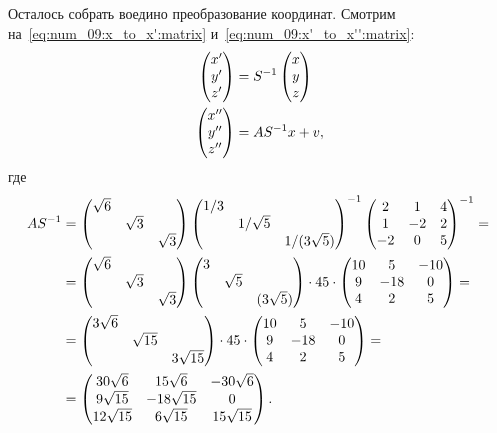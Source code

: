 \begin{solution}
	Осталось собрать воедино преобразование координат. Смотрим на~\eqref{eq:num_09:x_to_x':matrix} и~\eqref{eq:num_09:x'_to_x'':matrix}:
	\begin{align*}
		\begin{pmatrix}
			x' \\ y' \\ z'
		\end{pmatrix}
		&=
		S^{-1}
		\begin{pmatrix}
			x \\ y \\ z
		\end{pmatrix}
		\\
		\begin{pmatrix}
			x'' \\ y'' \\ z''
		\end{pmatrix}
		&=
		AS^{-1}x + v
		,
	\end{align*}
	где
	\begin{align*}
		AS^{-1} &=
		\begin{pmatrix}
			\sqrt{6} \\
			& \sqrt{3} \\
			&& \sqrt{3}
		\end{pmatrix}
		\begin{pmatrix}
			1/3 \\
			& 1/\sqrt{5} \\
			&& 1/(3\sqrt{5})
		\end{pmatrix}^{-1}
		\begin{pmatrix}
			2 & 1 & 4 \\
			1 & -2 & 2 \\
			-2 & 0 & 5
		\end{pmatrix}^{-1}
		= {} \\ {} &=
		\begin{pmatrix}
			\sqrt{6} \\
			& \sqrt{3} \\
			&& \sqrt{3}
		\end{pmatrix}
		\begin{pmatrix}
			3 \\
			& \sqrt{5} \\
			&& (3\sqrt{5})
		\end{pmatrix}
		\cdot
		45
		\cdot
		\begin{pmatrix}
			10 & 5 & -10 \\
			9 & -18 & 0 \\
			4 & 2 & 5
		\end{pmatrix}
		= {} \\ {} &=
		\begin{pmatrix}
			3\sqrt{6} \\
			& \sqrt{15} \\
			&& 3\sqrt{15}
		\end{pmatrix}
		\cdot
		45
		\cdot
		\begin{pmatrix}
			10 & 5 & -10 \\
			9 & -18 & 0 \\
			4 & 2 & 5
		\end{pmatrix}
		= {} \\ {} &=
		\begin{pmatrix}
			30\sqrt{6} & 15\sqrt{6} & -30\sqrt{6} \\
			9\sqrt{15} & -18\sqrt{15} & 0 \\
			12\sqrt{15} & 6\sqrt{15} & 15\sqrt{15}
		\end{pmatrix}
		.
	\end{align*}
\end{solution}
